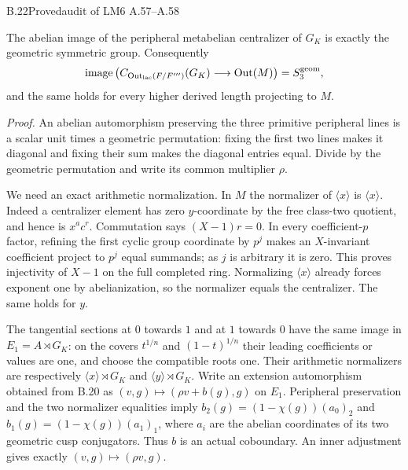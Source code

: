 \begin{statement}{B.22}{Proved}{audit of LM6 A.57--A.58}
\end{statement}
The abelian image of the peripheral metabelian centralizer
of $G_K$ is exactly the geometric symmetric group. Consequently
\[
 \operatorname{image}\left(
 C_{\operatorname{Out}_{\rm lac}(F/F''')}(G_K)
       \longrightarrow\operatorname{Out}(M)\right)
       =S_3^{\rm geom},
\]
and the same holds for every higher derived length projecting
to $M$.

\emph{Proof.}
An abelian automorphism preserving the three primitive
peripheral lines is a scalar unit times a geometric permutation:
fixing the first two lines makes it diagonal and fixing their
sum makes the diagonal entries equal. Divide by the geometric
permutation and write its common multiplier $\rho$.

We need an exact arithmetic normalization. In $M$ the normalizer
of $\langle x\rangle$ is $\langle x\rangle$. Indeed a centralizer
element has zero $y$-coordinate by the free class-two quotient,
and hence is $x^a c^r$. Commutation says $(X-1)r=0$. In every
coefficient-$p$ factor, refining the first cyclic group coordinate
by $p^j$ makes an $X$-invariant coefficient project to $p^j$
equal summands; as $j$ is arbitrary it is zero. This proves
injectivity of $X-1$ on the full completed ring. Normalizing
$\langle x\rangle$ already forces exponent one by abelianization,
so the normalizer equals the centralizer. The same holds for $y$.

The tangential sections at $0$ towards $1$ and at $1$ towards
$0$ have the same image in $E_1=A\rtimes G_K$: on the covers
$t^{1/n}$ and $(1-t)^{1/n}$ their leading coefficients or values
are one, and choose the compatible roots one. Their arithmetic
normalizers are respectively $\langle x\rangle\rtimes G_K$
and $\langle y\rangle\rtimes G_K$. Write an extension
automorphism obtained from B.20 as
$(v,g)\mapsto(\rho v+b(g),g)$ on $E_1$. Peripheral preservation
and the two normalizer equalities imply
$b_2(g)=(1-\chi(g))(a_0)_2$ and
$b_1(g)=(1-\chi(g))(a_1)_1$, where $a_i$ are the abelian
coordinates of its two geometric cusp conjugators. Thus $b$
is an actual coboundary. An inner adjustment gives exactly
$(v,g)\mapsto(\rho v,g)$.

